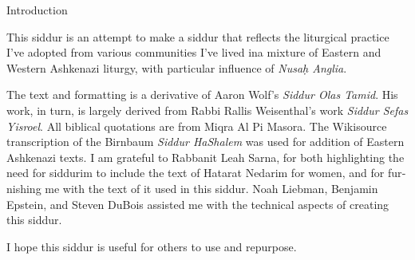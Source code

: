 \begin{minipage}{\textwidth}

\begin{english}
\begin{center} %
\begin{LARGE}
Introduction
\end{LARGE}
\end{center}

This siddur is an attempt to make a siddur that reflects the liturgical practice I've adopted from various communities I've lived in\textemdash a mixture of Eastern and Western Ashkenazi liturgy, with particular influence of \textit{Nusa\d{h} Anglia}.

The text and formatting is a derivative of Aaron Wolf's \textit{Siddur Olas Tamid}.  His work, in turn, is largely derived from Rabbi Rallis Weisenthal's work \textit{Siddur Sefas Yisroel}. All biblical quotations are from Miqra Al Pi Masora. The Wikisource transcription of the Birnbaum \textit{Siddur HaShalem} was used for addition of Eastern Ashkenazi texts. I am grateful to Rabbanit Leah Sarna, for both highlighting the need for siddurim to include the text of Hatarat Nedarim for women, and for furnishing me with the text of it used in this siddur.  Noah Liebman, Benjamin Epstein, and Steven DuBois assisted me with the technical aspects of creating this siddur.

I hope this siddur is useful for others to use and repurpose.

\end{english}

\end{minipage}

\renewcommand{\contentsname}{}
\tableofcontents

\mainmatter
{}


\vspace*{\fill}

\thispagestyle{empty}
\begin{Large}
\begin{center}
\end{center}
\end{Large}



\vspace*{\fill}


\centerlast

\renewcommand{\thefootnote}{\arabic{footnote}} %
\setlength{\parskip}{0.75em}

\newcommand{\halfline}{\vspace{0.5\baselineskip}}